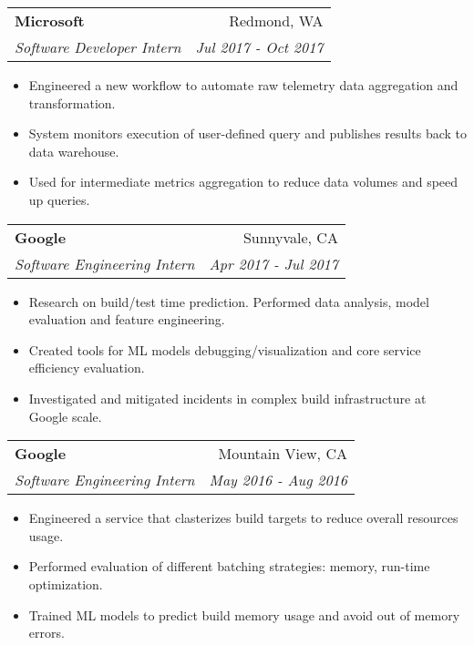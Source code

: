 \documentclass[letterpaper,11pt]{article}
\makeatletter
\newcommand{\resumeItem}[1]{
  \item\small{
    {#1 \vspace{-2pt}}
  }
}
\newcommand{\resumeSubheading}[4]{
  \vspace{-0pt}\item
    \begin{tabular*}{0.97\textwidth}{l@{\extracolsep{\fill}}r}
      \textbf{#1} & #2 \\
      \textit{\small#3} & \textit{\small #4} \\
    \end{tabular*}\vspace{-2pt}
}
\newcommand{\resumeItemListStart}{\begin{itemize}}
\newcommand{\resumeItemListEnd}{\end{itemize}\vspace{-0pt}}
\makeatother
\begin{document}
    \resumeSubheading
      {Microsoft}{Redmond, WA}
      {Software Developer Intern}{Jul 2017 - Oct 2017}
      \resumeItemListStart
        \resumeItem{Engineered a new workflow to automate raw telemetry data aggregation and transformation.}
        \resumeItem{System monitors execution of user-defined query and publishes results back to data warehouse.}
        \resumeItem{Used for intermediate metrics aggregation to reduce data volumes and speed up queries.}
      \resumeItemListEnd

    \resumeSubheading
      {Google}{Sunnyvale, CA}
      {Software Engineering Intern}{Apr 2017 - Jul 2017}
      \resumeItemListStart
        \resumeItem{Research on build/test time prediction. Performed data analysis, model evaluation and feature engineering.}
        \resumeItem{Created tools for ML models debugging/visualization and core service efficiency evaluation.}
        \resumeItem{Investigated and mitigated incidents in complex build infrastructure at Google scale.}
      \resumeItemListEnd

    \resumeSubheading
      {Google}{Mountain View, CA}
      {Software Engineering Intern}{May 2016 - Aug 2016}
      \resumeItemListStart
        \resumeItem{Engineered a service that clasterizes build targets to reduce overall resources usage.}
        \resumeItem{Performed evaluation of different batching strategies: memory, run-time optimization.}
        \resumeItem{Trained ML models to predict build memory usage and avoid out of memory errors.}
      \resumeItemListEnd
\end{document}
